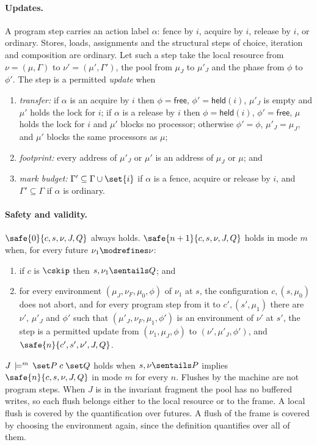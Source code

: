 \paragraph{Updates.}
A program step carries an action label $\alpha$: fence by $i$, acquire by
$i$, release by $i$, or ordinary. Stores, loads, assignments and the
structural steps of choice, iteration and composition are ordinary. Let
such a step take the local resource from $\nu = (\mu,\Gamma)$ to $\nu' = (\mu',\Gamma')$, the pool from
$\mu_J$ to $\mu'_J$ and the phase from $\phi$ to $\phi'$. The step is a
permitted \emph{update} when
\begin{enumerate}[nosep]
  \item \emph{transfer:}
    if $\alpha$ is an acquire by $i$ then $\phi = \textsf{free}$,
    $\phi' = \textsf{held}(i)$, $\mu'_J$ is empty and $\mu'$ holds the lock
    for $i$;
    if $\alpha$ is a release by $i$ then $\phi = \textsf{held}(i)$,
    $\phi' = \textsf{free}$, $\mu$ holds the lock for $i$ and $\mu'$ blocks
    no processor;
    otherwise $\phi' = \phi$, $\mu'_J = \mu_J$, and $\mu'$ blocks the same
    processors as $\mu$;
  \item \emph{footprint:} every address of $\mu'_J$ or $\mu'$ is an address
    of $\mu_J$ or $\mu$; and
  \item \emph{mark budget:} $\Gamma' \subseteq \Gamma \cup \set{i}$ if
    $\alpha$ is a fence, acquire or release by $i$, and
    $\Gamma' \subseteq \Gamma$ if $\alpha$ is ordinary.
\end{enumerate}

\paragraph{Safety and validity.}
$\safe{0}{c,s,\nu,J,Q}$ always holds. $\safe{n+1}{c,s,\nu,J,Q}$ holds in
mode $m$ when, for every future $\nu_1 \modrefines \nu$:
\begin{enumerate}[nosep]
  \item if $c$ is $\cskip$ then $s,\nu_1 \sentails Q$; and
  \item for every environment $(\mu_J,\nu_F,\mu_0,\phi)$ of $\nu_1$ at $s$,
    the configuration $c,(s,\mu_0)$ does not abort, and for every program
    step from it to $c',(s',\mu_1)$ there are $\nu'$, $\mu'_J$ and $\phi'$
    such that $(\mu'_J,\nu_F,\mu_1,\phi')$ is an environment of $\nu'$ at
    $s'$, the step is a permitted update from $(\nu_1,\mu_J,\phi)$ to
    $(\nu',\mu'_J,\phi')$, and $\safe{n}{c',s',\nu',J,Q}$.
\end{enumerate}
$\mtruespec{J}{m}{P}{c}{Q}$ holds when $s,\nu \sentails P$ implies
$\safe{n}{c,s,\nu,J,Q}$ in mode $m$ for every $n$. Flushes by the machine are not program steps. When $J$ is in the
invariant fragment the pool has no buffered writes, so each flush belongs
either to the local resource or to the frame. A local flush is covered by
the quantification over futures. A flush of the frame is covered by
choosing the environment again, since the definition quantifies over all
of them.

